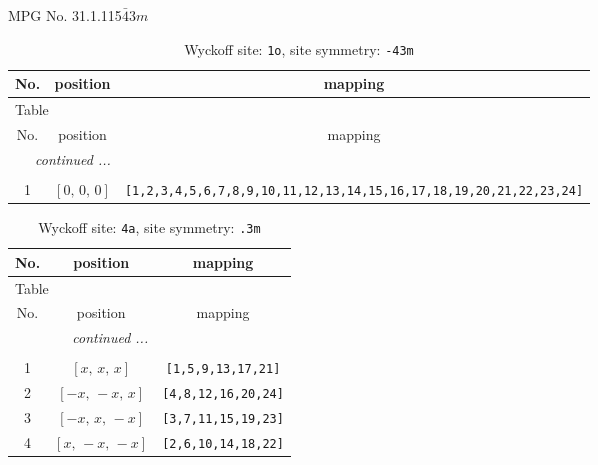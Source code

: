 \documentclass[fleqn,8pt]{jsarticle}
\begin{document}
\setcounter{MaxMatrixCols}{32}

\renewcommand{\tablename}{Table~}
\renewcommand{\figurename}{Figure~}
\begin{center}
\LARGE
MPG No. 31.1.115\quad$\bar{4}3m$
\end{center}
\renewcommand{\arraystretch}{1.2}
\begin{longtable}{ccc}
\caption{Wyckoff site: {\tt 1o}, site symmetry: {\tt -43m}}
 \\
 \hline \hline
No. & position & mapping \\ \hline \endfirsthead

\multicolumn{2}{l}{\tablename\ \thetable{}} \\
 \hline \hline
No. & position & mapping \\ \hline \endhead

 \hline \hline
\multicolumn{2}{r}{\footnotesize\it continued ...} \\ \endfoot

 \hline \hline
\multicolumn{2}{r}{} \\ \endlastfoot

1 & $\left[ 0,\, 0,\, 0 \right]$ & {\tt [1,2,3,4,5,6,7,8,9,10,11,12,13,14,15,16,17,18,19,20,21,22,23,24]} \\
\end{longtable}
\renewcommand{\arraystretch}{1.2}
\begin{longtable}{ccc}
\caption{Wyckoff site: {\tt 4a}, site symmetry: {\tt .3m}}
 \\
 \hline \hline
No. & position & mapping \\ \hline \endfirsthead

\multicolumn{2}{l}{\tablename\ \thetable{}} \\
 \hline \hline
No. & position & mapping \\ \hline \endhead

 \hline \hline
\multicolumn{2}{r}{\footnotesize\it continued ...} \\ \endfoot

 \hline \hline
\multicolumn{2}{r}{} \\ \endlastfoot

1 & $\left[ x,\, x,\, x \right]$ & {\tt [1,5,9,13,17,21]} \\ \hline
2 & $\left[ - x,\, - x,\, x \right]$ & {\tt [4,8,12,16,20,24]} \\ \hline
3 & $\left[ - x,\, x,\, - x \right]$ & {\tt [3,7,11,15,19,23]} \\ \hline
4 & $\left[ x,\, - x,\, - x \right]$ & {\tt [2,6,10,14,18,22]} \\
\end{longtable}
\end{document}

